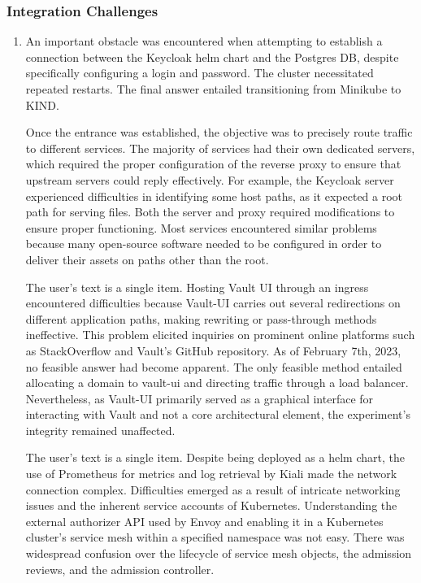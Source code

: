 \documentclass{ieeeaccess}
\begin{document}
\subsubsection{Integration Challenges} 

\begin{enumerate} [label=({\alph*}) , leftmargin=30px]

  \item An important obstacle was encountered when attempting to establish a connection between the Keycloak helm chart and the Postgres DB, despite specifically configuring a login and password. The cluster necessitated repeated restarts. The final answer entailed transitioning from Minikube to KIND.

     Once the entrance was established, the objective was to precisely route traffic to different services. The majority of services had their own dedicated servers, which required the proper configuration of the reverse proxy to ensure that upstream servers could reply effectively. For example, the Keycloak server experienced difficulties in identifying some host paths, as it expected a root path for serving files. Both the server and proxy required modifications to ensure proper functioning. Most services encountered similar problems because many open-source software needed to be configured in order to deliver their assets on paths other than the root.

    The user's text is a single item. Hosting Vault UI through an ingress encountered difficulties because Vault-UI carries out several redirections on different application paths, making rewriting or pass-through methods ineffective. This problem elicited inquiries on prominent online platforms such as StackOverflow and Vault's GitHub repository. As of February 7th, 2023, no feasible answer had become apparent. The only feasible method entailed allocating a domain to vault-ui and directing traffic through a load balancer. Nevertheless, as Vault-UI primarily served as a graphical interface for interacting with Vault and not a core architectural element, the experiment's integrity remained unaffected.

    The user's text is a single item. Despite being deployed as a helm chart, the use of Prometheus for metrics and log retrieval by Kiali made the network connection complex. Difficulties emerged as a result of intricate networking issues and the inherent service accounts of Kubernetes. Understanding the external authorizer API used by Envoy and enabling it in a Kubernetes cluster's service mesh within a specified namespace was not easy. There was widespread confusion over the lifecycle of service mesh objects, the admission reviews, and the admission controller.

\end{enumerate}
\end{document}
